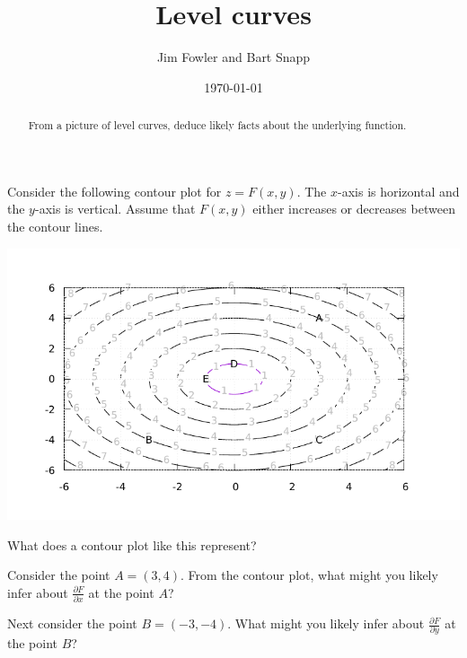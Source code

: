 \documentclass{ximera}
\author{Jim Fowler and Bart Snapp}
\date{\today}
\title{Level curves}
\begin{document}
\begin{abstract}
From a picture of level curves, deduce likely facts about the underlying function.
\end{abstract}

Consider the following contour plot for $z = F(x,y)$.  The $x$-axis is horizontal and the $y$-axis is vertical.  Assume that $F(x,y)$ either increases or decreases between the contour lines.

\includegraphics[width=.9\linewidth]{contourPlot1.pdf}

\begin{exercise}
What does a contour plot like this represent?
\begin{multipleChoice}
\end{multipleChoice}
\end{exercise}


\begin{exercise}
Consider the point $A = (3,4)$.  From the contour plot, what might you likely infer about $\frac{\partial F}{\partial x}$ at the point $A$?
\begin{multipleChoice}
\end{multipleChoice}
\end{exercise}

\begin{exercise}
Next consider the point $B = (-3,-4)$.  What might you likely infer about $\frac{\partial F}{\partial y}$ at the point $B$?
\begin{multipleChoice}
\end{multipleChoice}
\end{exercise}
\end{document}
